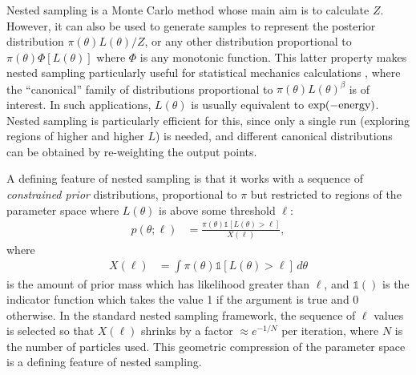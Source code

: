 \documentclass[article]{jss}
\begin{document}
Nested sampling \citep[NS;][]{skilling2006nested} is a Monte Carlo
method whose main aim is to calculate $Z$. However, it can also be
used to generate samples to represent the posterior distribution
$\pi(\theta)L(\theta)/Z$, or any other distribution proportional to
$\pi(\theta)\Phi\left[L(\theta)\right]$ where $\Phi$ is any monotonic
function.  This latter property makes nested sampling particularly useful for
statistical mechanics calculations \citep{partay2010efficient,
  baldock2016determining}, where the ``canonical'' family of
distributions proportional to $\pi(\theta)L(\theta)^\beta$ is of
interest. In such applications, $L(\theta)$ is usually equivalent to
$\exp(-\textnormal{energy})$. Nested sampling is particularly
efficient for this, since only a single run (exploring regions of
higher and higher $L$) is needed, and different canonical
distributions can be obtained by re-weighting the output points.

A defining feature of nested sampling is that it works with a sequence of
{\em constrained prior} distributions, proportional to $\pi$ but
restricted to regions of the parameter space where $L(\theta)$
is above some threshold $\ell$:
\begin{align}
p(\theta; \ell) &=
\frac{\pi(\theta)\mathds{1}\left[L(\theta) > \ell\right]}{X(\ell)},
\label{eqn:constrained_prior}
\end{align}
where
\begin{align*}
X(\ell) &= \int \pi(\theta) \mathds{1}\left[L(\theta) > \ell\right] \, d\theta
\end{align*}
is the amount of prior mass which has likelihood greater than $\ell$, and
$\mathds{1}()$ is the indicator function which takes the value 1 if the
argument is true and 0 otherwise.
In the standard nested sampling framework, the sequence of $\ell$ values is selected
so that $X(\ell)$ shrinks by a factor $\approx e^{-1/N}$ per iteration, where
$N$ is the number of particles used. This geometric compression of the
parameter space is a defining feature of nested sampling.
\end{document}
